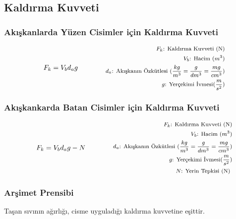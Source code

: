 \subsection{Kaldırma Kuvveti}

\subsubsection*{Akışkanlarda Yüzen Cisimler için Kaldırma Kuvveti}
\begin{equation}
    F_{k} = V_{b} d_{a} g \qquad \qquad \parbox{5.5cm}{\footnotesize$\begin{aligned}
        F_{k}\text{: Kaldırma Kuvveti (N)} \\
        V_{b}\text{: Hacim } (m^3) \\
        d_{a}\text{: Akışkanın Özkütlesi } (\frac{kg}{m^3} = \frac{g}{dm^3} = \frac{mg}{cm^3})  \\
        g\text{: Yerçekimi İvmesi} (\frac{m}{s^2})
\end{aligned}$}
\end{equation}

\subsubsection*{Akışkankarda Batan Cisimler için Kaldırma Kuvveti}
\begin{equation}
    F_{k} = V_{b} d_{a} g - N\qquad \qquad \parbox{5.5cm}{\footnotesize$\begin{aligned}
        F_{k}\text{: Kaldırma Kuvveti (N)} \\
        V_{b}\text{: Hacim } (m^3) \\
        d_{a}\text{: Akışkanın Özkütlesi } (\frac{kg}{m^3} = \frac{g}{dm^3} = \frac{mg}{cm^3})  \\
        g\text{: Yerçekimi İvmesi} (\frac{m}{s^2}) \\
        N\text{: Yerin Tepkisi (N) }
\end{aligned}$}
\end{equation}

\subsubsection*{Arşimet Prensibi}
\begin{theorem}
    Taşan sıvının ağırlığı, cisme uyguladığı kaldırma kuvvetine eşittir.
\end{theorem}
